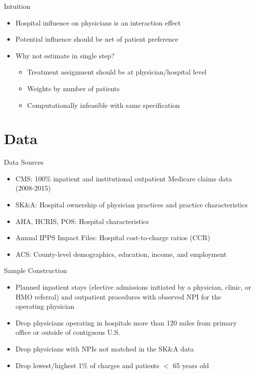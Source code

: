 \documentclass[t,aspectratio=169]{beamer}
\begin{document}
\begin{frame}{Intuition}
    \begin{itemize}
        \item Hospital influence on physicians is an interaction effect
        \item Potential influence should be net of patient preference
        \item Why not estimate in single step?
        \begin{itemize}
            \item Treatment assignment should be at physician/hospital level
            \item Weights by number of patients
            \item Computationally infeasible with same specification
        \end{itemize}
    \end{itemize}
\end{frame}

\section{Data}
\begin{frame}{Data Sources}
    \begin{itemize}
        \item CMS: 100\% inpatient and institutional outpatient Medicare claims data (2008-2015)
        \item SK\&A: Hospital ownership of physician practices and practice characteristics
        \item AHA, HCRIS, POS: Hospital characteristics
        \item Annual IPPS Impact Files: Hospital cost-to-charge ratios (CCR)
        \item ACS: County-level demographics, education, income, and employment
    \end{itemize}
\end{frame}

\begin{frame}{Sample Construction}
    \begin{itemize}
        \item<1-> Planned inpatient stays (elective admissions initiated by a physician, clinic, or HMO referral) and outpatient procedures with observed NPI for the operating physician
        \item<2-> Drop physicians operating in hospitals more than 120 miles from primary office or outside of contiguous U.S.
        \item<3-> Drop physicians with NPIs not matched in the SK\&A data
        \item<4-> Drop lowest/highest 1\% of charges and patients $<$ 65 years old
    \end{itemize}
\end{frame}
\end{document}
